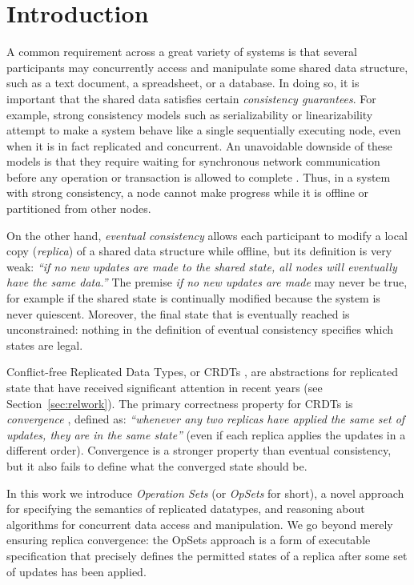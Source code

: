 \documentclass[11pt]{article}
\begin{document}
\section{Introduction}

A common requirement across a great variety of systems is that several participants may concurrently access and manipulate some shared data structure, such as a text document, a spreadsheet, or a database.
In doing so, it is important that the shared data satisfies certain \emph{consistency guarantees}.
For example, strong consistency models such as serializability \cite{Kleppmann:2017wj} or linearizability \cite{Herlihy:1990jq} attempt to make a system behave like a single sequentially executing node, even when it is in fact replicated and concurrent.
An unavoidable downside of these models is that they require waiting for synchronous network communication before any operation or transaction is allowed to complete \cite{Davidson:1985hv,Gilbert:2002il}.
Thus, in a system with strong consistency, a node cannot make progress while it is offline or partitioned from other nodes.

On the other hand, \emph{eventual consistency} \cite{Bailis:2013jc,Burckhardt:2014hy,Terry:1994fp,Vogels:2009ca} allows each participant to modify a local copy (\emph{replica}) of a shared data structure while offline, but its definition is very weak: \emph{``if no new updates are made to the shared state, all nodes will eventually have the same data.''}
The premise \emph{if no new updates are made} may never be true, for example if the shared state is continually modified because the system is never quiescent.
Moreover, the final state that is eventually reached is unconstrained: nothing in the definition of eventual consistency specifies which states are legal.

Conflict-free Replicated Data Types, or CRDTs \cite{Shapiro:2011wy,Shapiro:2011un}, are abstractions for replicated state that have received significant attention in recent years (see Section~\ref{sec:relwork}).
The primary correctness property for CRDTs is \emph{convergence} \cite{Shapiro:2011un,Gomes:2017gy}, defined as: \emph{``whenever any two replicas have applied the same set of updates, they are in the same state''} (even if each replica applies the updates in a different order).
Convergence is a stronger property than eventual consistency, but it also fails to define what the converged state should be.

In this work we introduce \emph{Operation Sets} (or \emph{OpSets} for short), a novel approach for specifying the semantics of replicated datatypes, and reasoning about algorithms for concurrent data access and manipulation.
We go beyond merely ensuring replica convergence: the OpSets approach is a form of executable specification that precisely defines the permitted states of a replica after some set of updates has been applied.
\end{document}
